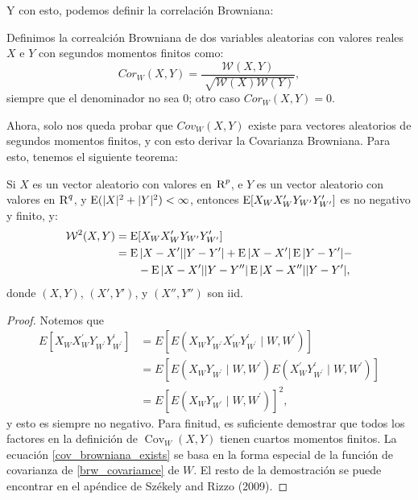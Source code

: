 		Y con esto, podemos definir la correlaci\'on Browniana:
		
		\begin{defn}
			Definimos la correalci\'on Browniana de dos variables aleatorias con valores reales $X$ e $Y$ con segundos momentos finitos como:
			\begin{equation}	
				Cor_W(X,Y) = \frac{\mathcal{W}(X,Y)}{\sqrt[]{\mathcal{W}(X)\mathcal{W}(Y)}},
			\end{equation}
			siempre que el denominador no sea 0; otro caso $Cor_W(X,Y) = 0$.
		\end{defn}

		Ahora, solo nos queda probar que $Cov_W(X,Y)$ existe para vectores aleatorios de segundos momentos finitos, y con esto derivar la Covarianza Browniana. Para esto, tenemos el siguiente teorema:

		\begin{thm}\label{thm_exists_cov_browniana}
			Si $X$ es un vector aleatorio con valores en $\textsc{R}^p$, e $Y$ es un vector aleatorio con valores en $\textsc{R}^q$, y $\operatorname{E}(|X|^2+|Y|^2)<\infty$, entonces $\operatorname{E}[X_{W}X'_{W}Y_{W'}Y'_{W'}]$ es no negativo y finito, y:
			\begin{align}
				\mathcal{W}^2(X,Y) &= \operatorname{E}[X_{W}X'_{W}Y_{W'}Y'_{W'}]\\
								   &= \operatorname{E}|X-X'||Y-Y'| + \operatorname{E}|X-X'|\operatorname{E}|Y-Y'| - \label{cov_browniana_exists} \\ 
								   &\qquad - \operatorname{E}|X-X'||Y-Y''|\operatorname{E}|X-X''||Y-Y'|,\label{eq_37_brcov}
 			\end{align}
			donde $(X,Y)$, $(X',Y')$, y $(X'',Y'')$ son iid.
		\end{thm}
		\begin{proof}
			Notemos que
			$$
			\begin{aligned}
			E\left[X_W X_W^{\prime} Y_{W^{\prime}} Y_{W^{\prime}}^{\prime}\right] & =E\left[E\left(X_W Y_{W^{\prime}} X_W^{\prime} Y_{W^{\prime}}^{\prime} \mid W, W^{\prime}\right)\right] \\
			& =E\left[E\left(X_W Y_{W^{\prime}} \mid W, W^{\prime}\right) E\left(X_W^{\prime} Y_{W^{\prime}}^{\prime} \mid W, W^{\prime}\right)\right] \\
			& =E\left[E\left(X_W Y_{W^{\prime}} \mid W, W^{\prime}\right)\right]^2,
			\end{aligned}
			$$
			y esto es siempre no negativo. Para finitud, es suficiente demostrar que todos los factores en la definici\'on de  $\operatorname{Cov}_W(X, Y)$ tienen cuartos momentos finitos. La ecuaci\'on \ref{cov_browniana_exists} se basa en la forma especial de la funci\'on de covarianza de \ref{brw_covariamce} de $W$. El resto de la demostraci\'on se puede encontrar en el ap\'endice de Sz\'ekely and Rizzo (2009)\cite{Szekely2009}.	
		\end{proof}

